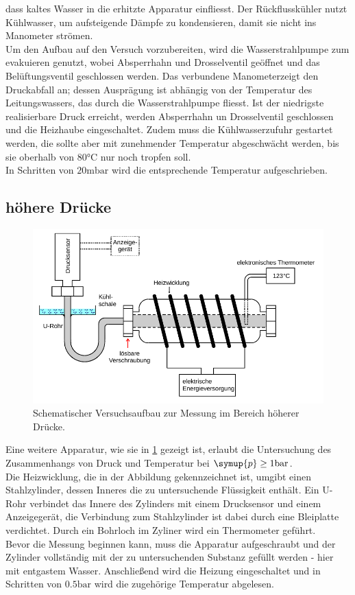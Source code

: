 dass kaltes Wasser in die erhitzte Apparatur einfliesst. Der Rückflusskühler nutzt Kühlwasser, um
aufsteigende Dämpfe zu kondensieren, damit sie nicht ins Manometer strömen. \\
Um den Aufbau auf den Versuch vorzubereiten, wird die Wasserstrahlpumpe zum evakuieren genutzt,
wobei Absperrhahn und Drosselventil geöffnet und das Belüftungsventil geschlossen werden.
Das verbundene Manometerzeigt den Druckabfall an; dessen Ausprägung ist abhängig von der
Temperatur des Leitungswassers, das durch die Wasserstrahlpumpe fliesst. Ist der niedrigste realisierbare
Druck erreicht, werden Absperrhahn un Drosselventil geschlossen und die Heizhaube eingeschaltet.
Zudem muss die Kühlwasserzufuhr gestartet werden, die sollte aber mit zunehmender Temperatur abgeschwächt 
werden, bis sie oberhalb von $80 \si{\degreeCelsius}$ nur noch tropfen soll.\\
In Schritten von $20 \si{\milli\bar}$ wird die entsprechende Temperatur aufgeschrieben.

\subsection{höhere Drücke}
\begin{figure}
    \centering
    \includegraphics[width=\textwidth]{apparatur2.png}
    \caption{Schematischer Versuchsaufbau zur Messung im Bereich höherer Drücke.}
    \label{fig:app2}
\end{figure}
Eine weitere Apparatur, wie sie in \ref{fig:app2} gezeigt ist, erlaubt die Untersuchung des Zusammenhangs
von Druck und Temperatur bei $\symup{p} \geq 1 \si{\bar}$.\\
Die Heizwicklung, die in der Abbildung gekennzeichnet ist, umgibt einen Stahlzylinder, dessen Inneres
die zu untersuchende Flüssigkeit enthält. Ein U-Rohr verbindet das Innere des Zylinders mit einem Drucksensor
und einem Anzeigegerät, die Verbindung zum Stahlzylinder ist dabei durch eine Bleiplatte 
verdichtet. Durch ein Bohrloch im Zyliner wird ein Thermometer geführt.\\
Bevor die Messung beginnen kann, muss die Apparatur aufgeschraubt und der Zylinder vollständig mit
der zu untersuchenden Substanz gefüllt werden - hier mit entgastem Wasser. Anschließend wird die Heizung
eingeschaltet und in Schritten von $0.5 \si{\bar}$ wird die zugehörige Temperatur abgelesen.

